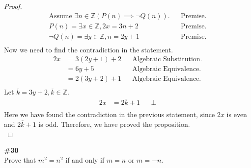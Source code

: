 \documentclass{article}
\newcommand{\problem}[1]{\textbf{\##1}\\}
\newcommand{\AllIntegers}{\mathbb{Z}}
\begin{document}
\begin{enumerate}[a)]
\begin{proof}
        \begin{align*}
            \text{Assume } \exists n \in \AllIntegers(P(n) \implies \neg Q(n)).&&\text{Premise.}\\
            P(n) = \exists x \in \AllIntegers, 2x = 3n + 2&&\text{Premise.}\\
            \neg Q(n) = \exists y \in \AllIntegers, n = 2y + 1&&\text{Premise.}\\            
        \end{align*}
        Now we need to find the contradiction in the statement.\\
        \begin{align*}
            2x &= 3(2y + 1) + 2&&\text{Algebraic Substitution.}\\
            &= 6y + 5 &&\text{Algebraic Equivalence.}\\
            & = 2(3y + 2) + 1&&\text{Algebraic Equivalence.}\\
        \end{align*}
        Let \(\bar{k}=3y+2, \bar{k}\in\AllIntegers.\)
        \begin{align*}
            2x &= 2\bar{k} + 1&&\bot\\
        \end{align*}
        Here we have found the contradiction in the previous statement, since \(2x\) is even and \(2\bar{k}+1\) is odd. Therefore, we have proved the proposition.\\
    \end{proof}
\end{enumerate}
\pagebreak
\problem{30}
Prove that \(m^2 = n^2\) if and only if \(m = n\) or \(m = -n\).
\end{document}
